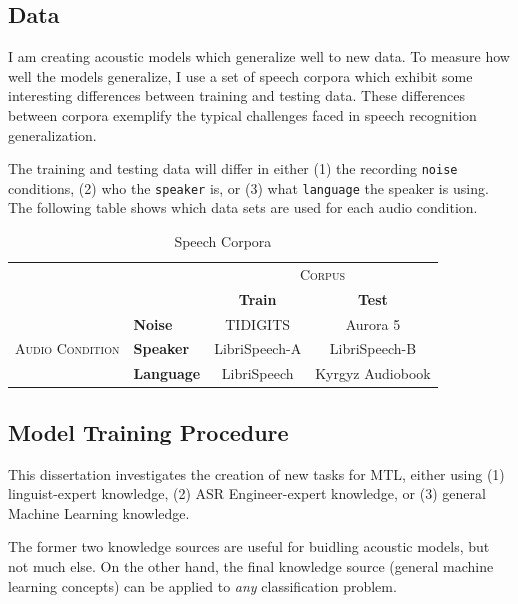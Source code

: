 \documentclass[10pt,a4paper]{article}
\begin{document}
\subsection{Data}

I am creating acoustic models which generalize well to new data. To measure how well the models generalize, I use a set of speech corpora which exhibit some interesting differences between training and testing data. These differences between corpora exemplify the typical challenges faced in speech recognition generalization.

The training and testing data will differ in either (1) the recording \texttt{noise} conditions, (2) who the \texttt{speaker} is, or (3) what \texttt{language} the speaker is using. The following table shows which data sets are used for each audio condition.


\begin{table}[!htbp]
  \centering
  \begin{adjustbox}{width=.75\textwidth}
    \begin{tabular}{clcc}
      \toprule
      && \multicolumn{2}{c}{\textsc{Corpus}}\\
      && \textbf{Train} & \textbf{Test}\\
      \midrule
      \multirow{3}{*}{\textsc{Audio Condition}} &\textbf{Noise} & TIDIGITS & Aurora 5 \\
      &\textbf{Speaker} & LibriSpeech-A & LibriSpeech-B \\
      &\textbf{Language} & LibriSpeech & Kyrgyz Audiobook \\
      \bottomrule
    \end{tabular}
    \label{table:data}
  \end{adjustbox}
  
  \caption{Speech Corpora}
  
\end{table}


\subsection{Model Training Procedure}

This dissertation investigates the creation of new tasks for MTL, either using (1) linguist-expert knowledge, (2) ASR Engineer-expert knowledge, or (3) general Machine Learning knowledge.

The former two knowledge sources are useful for buidling acoustic models, but not much else. On the other hand, the final knowledge source (general machine learning concepts) can be applied to \textit{any} classification problem.
\end{document}
